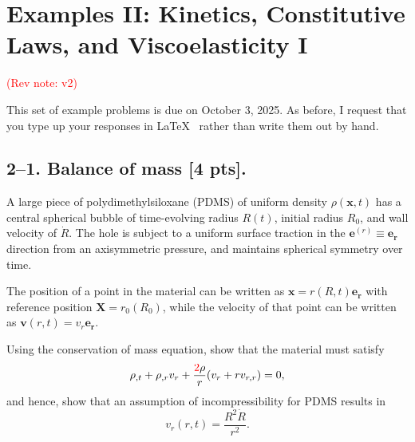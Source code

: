 \setcounter{section}{1} %


\section*{Examples II: Kinetics, Constitutive Laws, and Viscoelasticity I}
\label{PS2}
\textcolor{red}{(Rev note: v2)}


This set of example problems is due on October 3, 2025. 
As before, I request that you type up your responses in \LaTeX~ rather than write them out by hand. 

\medskip
\subsection*{2--1. \textbf{Balance of mass} [4 pts].} 
A large piece of polydimethylsiloxane (PDMS) of uniform density $\rho(\bm{x},t)$ has a central spherical bubble of time-evolving radius $R(t)$, initial radius $R_0$, and wall velocity of $\dot{R}$. 
The hole is subject to a uniform surface traction in the $\bm{e}^{(r)} \equiv \bm{e}_{\bm{r}}$ direction from an axisymmetric pressure, and maintains spherical symmetry over time. 

\medskip
The position of a point in the material can be written as $\bm{x} = r(R,t) \bm{e}_{\bm{r}}$ with reference position $\bm{X} = r_0(R_0)$, while the velocity of that point can be written as $\bm{v}(r,t) = v_r \bm{e}_{\bm{r}}$.

\medskip
Using the conservation of mass equation, show that the material must satisfy
\begin{equation*}
\rho_{,t}+ \rho_{,r} v_r + \frac{\textcolor{red}{2}\rho}{r} (v_r + r v_{r,r}) = 0,
\end{equation*}
and hence, show that an assumption of incompressibility for PDMS results in 
\begin{equation*}
v_r(r,t) = \frac{R^2 \dot{R}}{r^2}.
\end{equation*}

